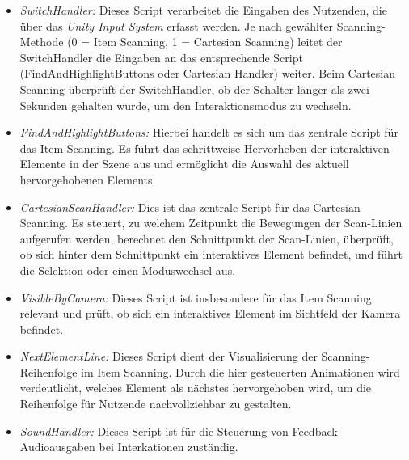 \begin{itemize}
    \item \textit{SwitchHandler:}
    Dieses Script verarbeitet die Eingaben des Nutzenden, die über das \textit{Unity Input System} erfasst werden. Je nach gewählter Scanning-Methode (0 = Item Scanning, 1 = Cartesian Scanning) leitet der SwitchHandler die Eingaben an das entsprechende Script (FindAndHighlightButtons oder Cartesian Handler) weiter. Beim Cartesian Scanning überprüft der SwitchHandler, ob der Schalter länger als zwei Sekunden gehalten wurde, um den Interaktionsmodus zu wechseln.
    \item \textit{FindAndHighlightButtons:}
    Hierbei handelt es sich um das zentrale Script für das Item Scanning. Es führt das schrittweise Hervorheben der interaktiven Elemente in der Szene aus und ermöglicht die Auswahl des aktuell hervorgehobenen Elements.
    \item \textit{CartesianScanHandler:} 
    Dies ist das zentrale Script für das Cartesian Scanning. Es steuert, zu welchem Zeitpunkt die Bewegungen der Scan-Linien aufgerufen werden, berechnet den Schnittpunkt der Scan-Linien, überprüft, ob sich hinter dem Schnittpunkt ein interaktives Element befindet, und führt die Selektion oder einen Moduswechsel aus. 
    \item \textit{VisibleByCamera:}
    Dieses Script ist insbesondere für das Item Scanning relevant und prüft, ob sich ein interaktives Element im Sichtfeld der Kamera befindet.
    \item \textit{NextElementLine:} 
    Dieses Script dient der Visualisierung der Scanning-Reihenfolge im Item Scanning. Durch die hier gesteuerten Animationen wird verdeutlicht, welches Element als nächstes hervorgehoben wird, um die Reihenfolge für Nutzende nachvollziehbar zu gestalten.
    \item \textit{SoundHandler:}
    Dieses Script ist für die Steuerung von Feedback-Audioausgaben bei Interkationen zuständig.
\end{itemize}

